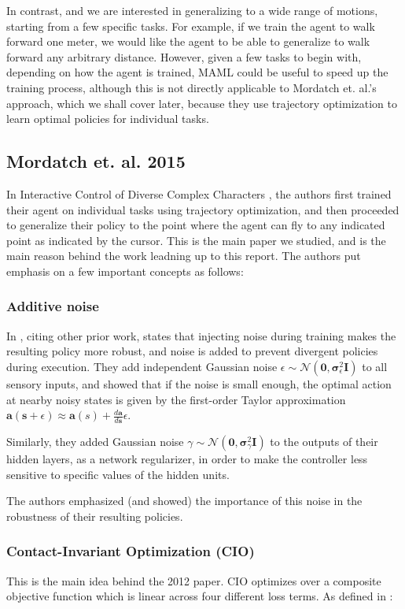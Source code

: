 \documentclass{article}
\newcommand{\bvec}[1]{\boldsymbol{#1}}
\begin{document}
In contrast, and we are interested in generalizing to a wide range of motions, starting from a few specific tasks. For example, if we train the agent to walk forward one meter, we would like the agent to be able to generalize to walk forward any arbitrary distance. However, given a few tasks to begin with, depending on how the agent is trained, MAML could be useful to speed up the training process, although this is not directly applicable to Mordatch et. al.'s approach, which we shall cover later, because they use trajectory optimization to learn optimal policies for individual tasks.

\subsection{Mordatch et. al. 2015}
In Interactive Control of Diverse Complex Characters \cite{mordatch2015interactive}, the authors first trained their agent on individual tasks using trajectory optimization, and then proceeded to generalize their policy to the point where the agent can fly to any indicated point as indicated by the cursor. This is the main paper we studied, and is the main reason behind the work leadning up to this report. The authors put emphasis on a few important concepts as follows:

\subsubsection{Additive noise}
In \cite{mordatch2015interactive}, citing other prior work, states that injecting noise during training makes the resulting policy more robust, and noise is added to prevent divergent policies during execution. They add independent Gaussian noise $\epsilon \sim \mathcal{N}(\bvec{0}, \bvec{\sigma}^2_{\epsilon}\bvec{I})$ to all sensory inputs, and showed that if the noise is small enough, the optimal action at nearby noisy states is given by the first-order Taylor approximation $\bvec{a}(\bvec{s}+\epsilon) \approx \bvec{a}(s) + \frac{d\bvec{a}}{d\bvec{s}}\epsilon$.

Similarly, they added Gaussian noise $\gamma \sim \mathcal{N}(\bvec{0}, \bvec{\sigma}^2_{\gamma}\bvec{I})$ to the outputs of their hidden layers, as a network regularizer, in order to make the controller less sensitive to specific values of the hidden units.

The authors emphasized (and showed) the importance of this noise in the robustness of their resulting policies.

\subsubsection{Contact-Invariant Optimization (CIO)}
This is the main idea behind the 2012 paper. CIO optimizes over a composite objective function which is linear across four different loss terms. As defined in \cite{mordatch2012contact}:
\end{document}
